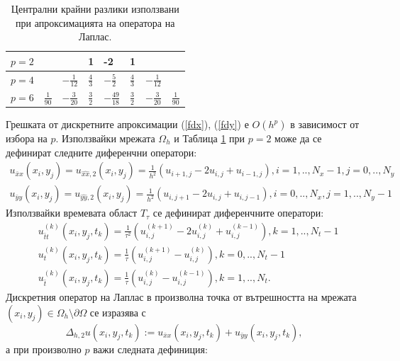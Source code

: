 \documentclass{article}
\newcommand{\rf}[1]{(\ref{#1})}
\begin{document}
\begin{table}[ht]
\centering
\small
		\begin{tabular}{||c|l|l|l|l|l|l|l||}
			\hline
			\hline
            $p=2$          &          &                                 &     1      &   -2   &    1    &    &        \\
   			\hline 
			\hline 
           $p=4$          &                            &   $-\frac{1}{12}$     &     $\frac{4}{3}$      &   $-\frac{5}{2} $     &    $\frac{4}{3}$    &  $-\frac{1}{12}$   &        \\
	   \hline
			\hline 
            $p=6$        &   $\frac{1}{90}$       &     $-\frac{3}{20}$     &    $\frac{3}{2}$      &    $-\frac{49}{18}$   &    $\frac{3}{2}$    & $-\frac{3}{20}$    &    $\frac{1}{90}$       \\
	   \hline
			\hline 
		\end{tabular}
	\caption{Централни крайни разлики използвани при апроксимацията на оператора на Лаплас.}
	\label{table:A00}
\end{table}
Грешката от дискретните апроксимации \rf{fdx}, \rf{fdy} е $O(h^p)$ в зависимост от избора на $p$. Използвайки мрежата $\Omega_h$ и Таблица \ref{table:A00} при $p=2$ може да се дефинират следните диференчни оператори:
\begin{align}
u_{\bar{x}x}(x_i,y_j) = u_{\widehat{xx},2}(x_i,y_j) = \frac{1}{h^2}(u_{i+1,j} - 2u_{i,j} + u_{i-1,j}), i = 1,.., N_x-1, j = 0,.., N_y \nonumber\\
u_{\bar{y}y}(x_i,y_j) = u_{\widehat{yy},2}(x_i,y_j) = \frac{1}{h^2}(u_{i,j+1} - 2u_{i,j} + u_{i,j-1}), i = 0,.., N_x, j = 1,.., N_y-1 \nonumber
\end{align}
Използвайки времевата област $T_{\tau}$ се дефинират диференчните оператори:
\begin{align}
& u^{(k)}_{\bar{t}t}(x_i,y_j,t_k) = \frac{1}{\tau^2}(u_{i,j}^{(k+1)} - 2u_{i,j}^{(k)} + u_{i,j}^{(k-1)}), k = 1,..,N_t-1 \nonumber\\
& u^{(k)}_{t}(x_i,y_j,t_k) =  \frac{1}{\tau}(u_{i,j}^{(k+1)} - u_{i,j}^{(k)}), k = 0,.., N_{t}-1 \nonumber\\
& u^{(k)}_{\bar{t}}(x_i,y_j,t_k) =  \frac{1}{\tau}(u_{i,j}^{(k)} - u_{i,j}^{(k-1)}), k = 1,.., N_{t} \nonumber.
\end{align}
Дискретния оператор на Лаплас в произволна точка от вътрешността на мрежата $(x_i, y_j) \in \Omega_h \setminus \partial\Omega$ се изразява с 
$$\Delta_{h,2}u(x_i, y_j, t_k) :=  u_{\bar{x}x}(x_i, y_j, t_k) + u_{\bar{y}y}(x_i, y_j, t_k),$$
а при произволно $p$ важи следната дефиниция:
\end{document}
